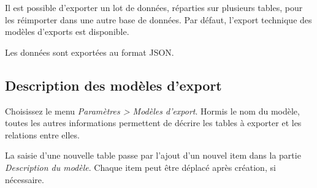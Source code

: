 Il est possible d'exporter un lot de données, réparties sur plusieurs tables, pour les réimporter dans une autre base de données. Par défaut, l'export \og technique\fg{} des modèles d'exports est disponible.

Les données sont exportées au format JSON.

\subsection{Description des modèles d'export}

Choisissez le menu \textit{Paramètres > Modèles d'export}. Hormis le nom du modèle, toutes les autres informations permettent de décrire les tables à exporter et les relations entre elles.

La saisie d'une nouvelle table passe par l'ajout d'un nouvel item dans la partie \textit{Description du modèle}. Chaque item peut être déplacé après création, si nécessaire.

